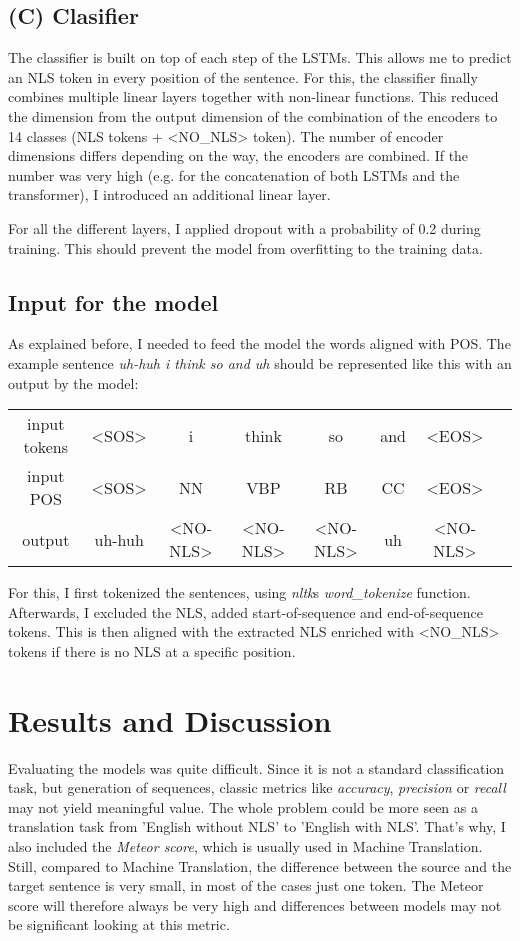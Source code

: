 \documentclass[
	11pt, %
]{fphw}
\begin{document}
\subsection*{(C) Clasifier}
The classifier is built on top of each step of the LSTMs. This allows me to predict an NLS token in every position of the sentence. For this, the classifier finally combines multiple linear layers together with non-linear functions. This reduced the dimension from the output dimension of the combination of the encoders to 14 classes (NLS tokens + <NO\_NLS> token). The number of encoder dimensions differs depending on the way, the encoders are combined. If the number was very high (e.g. for the concatenation of both LSTMs and the transformer), I introduced an additional linear layer.

For all the different layers, I applied dropout with a probability of 0.2 during training. This should prevent the model from overfitting to the training data.

\subsection*{Input for the model}
As explained before, I needed to feed the model the words aligned with POS. The example sentence \emph{uh-huh i think so and uh} should be represented like this with an output by the model:

\begin{table}[h]
    \centering
    \begin{tabular}{c || c c c c c c c}
        input  tokens & <SOS>  & i        & think    & so       & and & <EOS>    \\
        input POS     & <SOS>  & NN       & VBP      & RB       & CC  & <EOS>    \\
        \hline
        output        & uh-huh & <NO-NLS> & <NO-NLS> & <NO-NLS> & uh  & <NO-NLS>
    \end{tabular}
\end{table}

For this, I first tokenized the sentences, using \emph{nltk}s \emph{word\_tokenize} function. Afterwards, I excluded the NLS, added start-of-sequence and end-of-sequence tokens. This is then aligned with the extracted NLS enriched with <NO\_NLS> tokens if there is no NLS at a specific position.

\section*{Results and Discussion}
Evaluating the models was quite difficult. Since it is not a standard classification task, but generation of sequences, classic metrics like \emph{accuracy}, \emph{precision} or \emph{recall} may not yield meaningful value. The whole problem could be more seen as a translation task from 'English without NLS' to 'English with NLS'. That's why, I also included the \emph{Meteor score}, which is usually used in Machine Translation. Still, compared to Machine Translation, the difference between the source and the target sentence is very small, in most of the cases just one token. The Meteor score will therefore always be very high and differences between models may not be significant looking at this metric.
\end{document}
